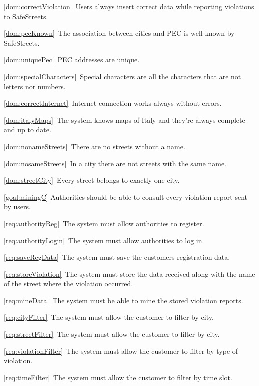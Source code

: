 \begin{description}
\begin{description}
\begin{description}
							\item \ref{dom:correctViolation}\ Users always insert correct data while reporting violations to SafeStreets.
							\item \ref{dom:pecKnown}\ The association between cities and PEC is well-known by SafeStreets.
							\item \ref{dom:uniquePec}\ PEC addresses are unique.
							\item \ref{dom:specialCharacters}\ Special characters are all the characters that are not letters nor numbers.
							\item \ref{dom:correctInternet}\ Internet connection works always without errors.
							\item \ref{dom:italyMaps}\ The system knows maps of Italy and they’re always complete and up to date.
							\item \ref{dom:nonameStreets}\ There are no streets without a name.
							\item \ref{dom:nosameStreets}\ In a city there are not streets with the same name.
							\item \ref{dom:streetCity}\ Every street belongs to exactly one city.
						\end{description}
					\item \ref{goal:miningC} Authorities should be able to consult every violation report sent by users.
						\begin{description}
							\item \ref{req:authorityReg}\ The system must allow authorities to register.
							\item \ref{req:authorityLogin}\ The system must allow authorities to log in.
							\item \ref{req:saveRegData}\ The system must save the customers registration data.
							\item \ref{req:storeViolation}\ The system must store the data received along with the name of the street where the violation occurred.
							\item \ref{req:mineData}\ The system must be able to mine the stored violation reports.
							\item \ref{req:cityFilter}\ The system must allow the customer to filter by city.
							\item \ref{req:streetFilter}\ The system must allow the customer to filter by city.
							\item \ref{req:violationFilter}\ The system must allow the customer to filter by type of violation.
							\item \ref{req:timeFilter}\ The system must allow the customer to filter by time slot.

\end{description}
\end{description}
\end{description}
